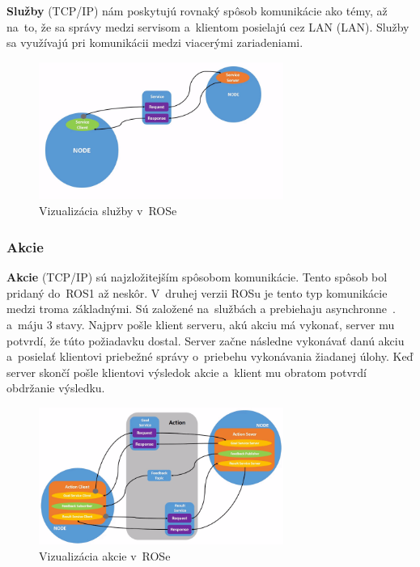 \textbf {Služby} (TCP/IP) nám poskytujú rovnaký spôsob komunikácie ako témy, až na~to, že sa správy medzi servisom a~klientom posielajú
cez LAN (\acrlong{LAN}). Služby sa využívajú pri komunikácii medzi viacerými zariadeniami.

\begin{figure}[h]
	\centering
	\includegraphics[width=8cm]{img/serviceExplanation.png}
	\caption{Vizualizácia služby v~ROSe~\cite{RosDoc}}
	\label{fig:service}
\end{figure}

\subsubsection{Akcie}

\label{s_action}
\textbf {Akcie} (TCP/IP) sú najzložitejším spôsobom komunikácie. Tento spôsob bol pridaný do~ROS1 až neskôr. V~druhej verzii ROSu je tento
typ komunikácie medzi troma základnými. Sú založené na~službách a prebiehaju asynchronne~\cite{ROS2book}. a~máju 3 stavy. Najprv pošle klient serveru,
akú akciu má vykonať, server mu potvrdí, že túto požiadavku dostal. Server začne následne vykonávať danú akciu a~posielať klientovi priebežné správy
o~priebehu vykonávania žiadanej úlohy. Keď server skončí pošle klientovi výsledok akcie a~klient mu obratom potvrdí obdržanie výsledku.

\begin{figure}[h]
	\centering
	\includegraphics[width=8cm]{img/actionExplanation.png}
	\caption{Vizualizácia akcie v~ROSe~\cite{RosDoc}}
	\label{fig:action}
\end{figure}

